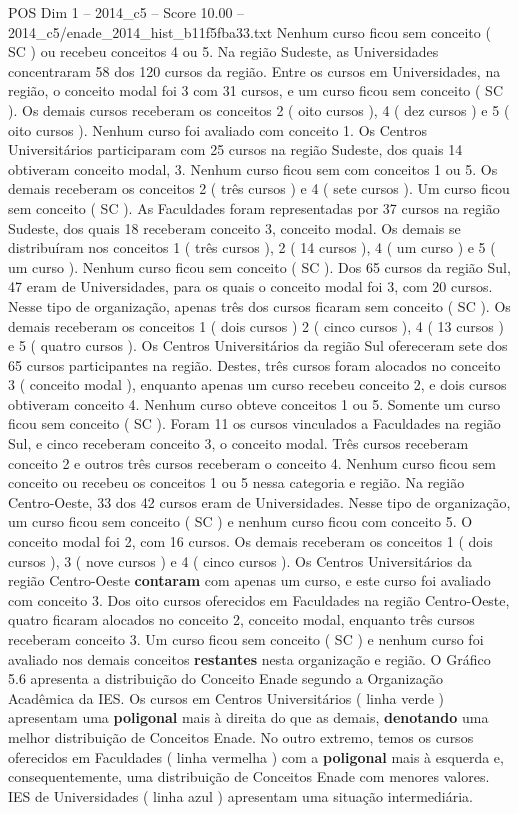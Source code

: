 \begin{textsample}{POS Dim 1 – 2014\_c5 – Score 10.00 – 2014\_c5/enade\_2014\_hist\_b11f5fba33.txt}
Nenhum curso ficou sem conceito ( SC ) ou recebeu conceitos 4 ou 5.
Na região Sudeste, as Universidades concentraram 58 dos 120 cursos da região.
Entre os cursos em Universidades, na região, o conceito modal foi 3 com 31 cursos, e um curso ficou sem conceito ( SC ).
Os demais cursos receberam os conceitos 2 ( oito cursos ), 4 ( dez cursos ) e 5 ( oito cursos ).
Nenhum curso foi avaliado com conceito 1.
Os Centros Universitários participaram com 25 cursos na região Sudeste, dos quais 14 obtiveram conceito modal, 3.
Nenhum curso ficou sem com conceitos 1 ou 5.
Os demais receberam os conceitos 2 ( três cursos ) e 4 ( sete cursos ).
Um curso ficou sem conceito ( SC ).
As Faculdades foram representadas por 37 cursos na região Sudeste, dos quais 18 receberam conceito 3, conceito modal.
Os demais se distribuíram nos conceitos 1 ( três cursos ), 2 ( 14 cursos ), 4 ( um curso ) e 5 ( um curso ).
Nenhum curso ficou sem conceito ( SC ).
Dos 65 cursos da região Sul, 47 eram de Universidades, para os quais o conceito modal foi 3, com 20 cursos.
Nesse tipo de organização, apenas três dos cursos ficaram sem conceito ( SC ).
Os demais receberam os conceitos 1 ( dois cursos ) 2 ( cinco cursos ), 4 ( 13 cursos ) e 5 ( quatro cursos ).
Os Centros Universitários da região Sul ofereceram sete dos 65 cursos participantes na região.
Destes, três cursos foram alocados no conceito 3 ( conceito modal ), enquanto apenas um curso recebeu conceito 2, e dois cursos obtiveram conceito 4.
Nenhum curso obteve conceitos 1 ou 5.
Somente um curso ficou sem conceito ( SC ).
Foram 11 os cursos vinculados a Faculdades na região Sul, e cinco receberam conceito 3, o conceito modal.
Três cursos receberam conceito 2 e outros três cursos receberam o conceito 4.
Nenhum curso ficou sem conceito ou recebeu os conceitos 1 ou 5 nessa categoria e região.
Na região Centro-Oeste, 33 dos 42 cursos eram de Universidades.
Nesse tipo de organização, um curso ficou sem conceito ( SC ) e nenhum curso ficou com conceito 5.
O conceito modal foi 2, com 16 cursos.
Os demais receberam os conceitos 1 ( dois cursos ), 3 ( nove cursos ) e 4 ( cinco cursos ).
Os Centros Universitários da região Centro-Oeste \textbf{contaram} com apenas um curso, e este curso foi avaliado com conceito 3.
Dos oito cursos oferecidos em Faculdades na região Centro-Oeste, quatro ficaram alocados no conceito 2, conceito modal, enquanto três cursos receberam conceito 3.
Um curso ficou sem conceito ( SC ) e nenhum curso foi avaliado nos demais conceitos \textbf{restantes} nesta organização e região.
O Gráfico 5.6 apresenta a distribuição do Conceito Enade segundo a Organização Acadêmica da IES.
Os cursos em Centros Universitários ( linha verde ) apresentam uma \textbf{poligonal} mais à direita do que as demais, \textbf{denotando} uma melhor distribuição de Conceitos Enade.
No outro extremo, temos os cursos oferecidos em Faculdades ( linha vermelha ) com a \textbf{poligonal} mais à esquerda e, consequentemente, uma distribuição de Conceitos Enade com menores valores.
IES de Universidades ( linha azul ) apresentam uma situação intermediária.

\end{textsample}
